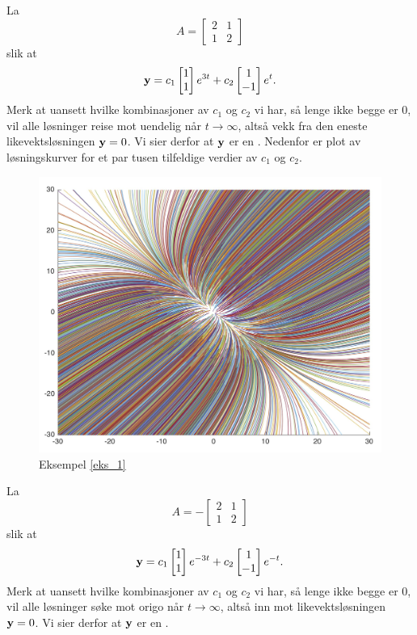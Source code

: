\begin{ex}
\label{eks_1}
La 
\[
A=
\begin{bmatrix}
2 & 1  \\
1 & 2 
\end{bmatrix}
\]
slik at 
\[
\mathbf{y}=
c_1
\begin{bmatrix}
1  \\
1 
\end{bmatrix} e^{3t}
+
c_2
\begin{bmatrix}
1  \\
-1 
\end{bmatrix}e^{t}. 
\]
Merk at uansett hvilke kombinasjoner av $c_1$ og $c_2$ vi har, så lenge ikke begge er 0, 
vil alle løsninger reise mot uendelig når $t\to \infty$, altså vekk fra den eneste likevektsløsningen $\mathbf{y}=0$. 
Vi sier derfor at $\mathbf{y}$ er en . 
Nedenfor er plot av løsningskurver for et par tusen tilfeldige verdier av $c_1$ og $c_2$.
\end{ex}

\begin{figure}[htbp]
  \begin{center}
	\includegraphics[scale=.1]{eks_1.jpg}
	\captionsetup{labelformat=empty}
	\caption{Eksempel \ref{eks_1}}
	\end{center}
\end{figure}


\begin{ex}
La 
\[
A=
-
\begin{bmatrix}
2 & 1  \\
1 & 2 
\end{bmatrix}
\]
slik at 
\[
\mathbf{y}=
c_1
\begin{bmatrix}
1  \\
1 
\end{bmatrix} e^{-3t}
+
c_2
\begin{bmatrix}
1  \\
-1 
\end{bmatrix}e^{-t}. 
\]
Merk at uansett hvilke kombinasjoner av $c_1$ og $c_2$ vi har, så lenge ikke begge er 0, 
vil alle løsninger søke mot origo når $t\to \infty$, altså inn mot likevektsløsningen $\mathbf{y}=0$. 
Vi sier derfor at $\mathbf{y}$ er en .
\end{ex}

